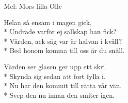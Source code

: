 \begin{SongText}[Påfyllningssång]
    \begin{SongInfo}
        Mel: Mors lilla Olle
    \end{SongInfo}
    \begin{SongVerse}
        Helan så ensam i magen gick,\\*%
        Undrade varför ej sällskap han fick?\\*%
        Värden, ack säg var är halvan i kväll?\\*%
        Bed honom komma till oss är du snäll.
    \end{SongVerse}
    \begin{SongVerse}
        Värden ser glasen ger upp ett skri.\\*%
        Skynda sig sedan att fort fylla i.\\*%
        Nu har den kommit till rätta vår vän.\\*%
        Svep den nu innan den smiter igen.
    \end{SongVerse}
\end{SongText}
